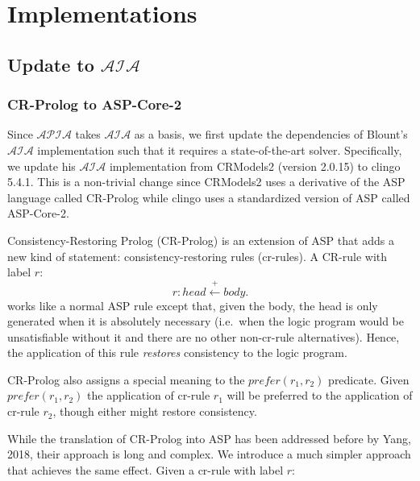 \chapter{Implementations}

%

\section{Update to $\mathcal{AIA}$}

\subsection{CR-Prolog to ASP-Core-2}

Since $\mathcal{APIA}$ takes $\mathcal{AIA}$ as a basis, we first update the dependencies of Blount's $\mathcal{AIA}$ implementation such that it requires a state-of-the-art solver.
Specifically, we update his $\mathcal{AIA}$ implementation from CRModels2 (version 2.0.15) to clingo 5.4.1.
This is a non-trivial change since CRModels2 uses a derivative of the ASP language called CR-Prolog while clingo uses a standardized version of ASP called ASP-Core-2.

Consistency-Restoring Prolog (CR-Prolog) is an extension of ASP that adds a new kind of statement: consistency-restoring rules (cr-rules).
A CR-rule with label $r$:
\begin{equation}
    r: head \stackrel{+}\leftarrow body.
\end{equation}
works like a normal ASP rule except that, given the body, the head is only generated when it is absolutely necessary (i.e.~when the logic program would be unsatisfiable without it and there are no other non-cr-rule alternatives).
Hence, the application of this rule \textit{restores} consistency to the logic program.

CR-Prolog also assigns a special meaning to the $prefer(r_1, r_2)$ predicate.
Given $prefer(r_1, r_2)$ the application of cr-rule $r_1$ will be preferred to the application of cr-rule $r_2$, though either might restore consistency.

While the translation of CR-Prolog into ASP has been addressed before by Yang, 2018, their approach is long and complex.
We introduce a much simpler approach that achieves the same effect.
Given a cr-rule with label $r$:

